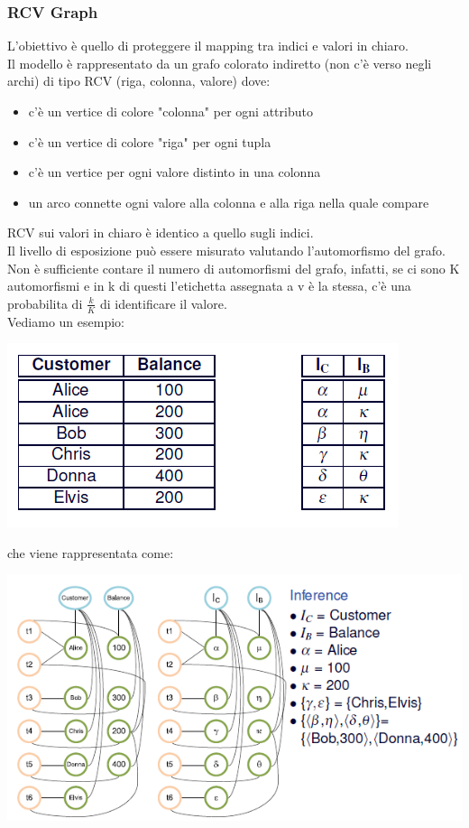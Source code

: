 \subsubsection{RCV Graph}
L'obiettivo è quello di proteggere il mapping tra indici e valori in chiaro.\\
Il modello è rappresentato da un grafo colorato indiretto (non c'è verso negli archi) di tipo RCV (riga, colonna, valore) dove:
\begin{itemize}
    \item c'è un vertice di colore "colonna" per ogni attributo
    \item c'è un vertice di colore "riga" per ogni tupla
    \item c'è un vertice per ogni valore distinto in una colonna
    \item un arco connette ogni valore alla colonna e alla riga nella quale compare
\end{itemize}
RCV sui valori in chiaro è identico a quello sugli indici. \\
Il livello di esposizione può essere misurato valutando l'automorfismo del grafo. \\
Non è sufficiente contare il numero di automorfismi del grafo, infatti, se ci sono K automorfismi e in k di questi l'etichetta assegnata a v è la stessa, c'è una probabilita di \(\frac{k}{K}\) di identificare il valore.\\
Vediamo un esempio:
\begin{center}
    \includegraphics[scale=0.6]{img/dbdbk.png}
\end{center}
che viene rappresentata come:
\begin{center}
    \includegraphics[scale=0.6]{img/expdbdbk.png}
\end{center}
